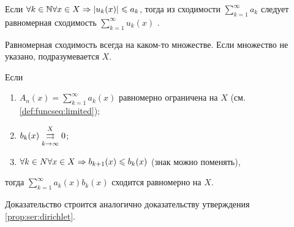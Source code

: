 \documentclass[../main.tex]{subfiles}
\begin{document}
\begin{corollary}
  Если $ \forall k \in \N \forall x \in X \hence \left| u_k(x)  \right| \leq a_k $, тогда из сходимости $ \sum_{k=1}^{\infty} a_k $ следует равномерная сходимость $ \sum_{k=1}^{\infty} u_k(x)  $ . 
\end{corollary}


\begin{note}
  Равномерная сходимость всегда на каком-то множестве. Если множество не указано, подразумевается $ X$.
\end{note}

\begin{proposition} 
  Если
  \begin{enumerate}
    \item $ A_n (x) = \sum_{k=1}^{\infty} a_k(x) $ равномерно ограничена на $ X$ (см. \ref{def:funcseq:limited});
    \item $ b_k(x) \convergesuniformly{k \to \infty}{X} 0$;
    \item $ \forall k \in N \forall x \in X \hence b_{k+1}(x) \leq b_{k}(x)$ (знак можно поменять),
  \end{enumerate}
  тогда $ \sum_{k=1}^{\infty} a_k (x) b_k (x) $ сходится равномерно на $ X$. 
\end{proposition}


\begin{note}
  Доказательство строится аналогично доказательству утверждения \ref{prop:ser:dirichlet}.
\end{note}
\end{document}
